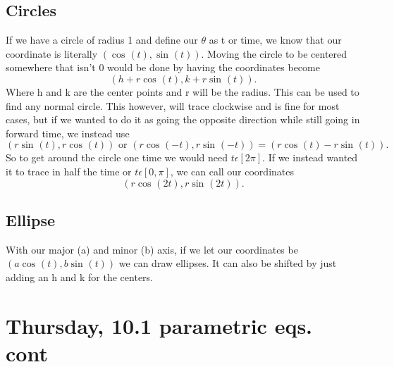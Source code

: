 \subsection{Circles}%
\label{sub:Circles}
If we have a circle of radius 1 and define our $ \theta $ as t or time, we know that our coordinate is literally $ \left( \cos^{  } \left( t \right) ,\sin^{  } \left( t \right)  \right)  $. Moving the circle to be centered somewhere that isn't 0 would be done by having the coordinates become
\[
\left( h+r\cos^{  } \left( t \right) ,k+r\sin^{  } \left( t \right)  \right)
.\] 
Where h and k are the center points and r will be the radius. This can be used to find any normal circle. This however, will trace clockwise and is fine for most cases, but if we wanted to do it as going the opposite direction while still going in forward time, we instead use 
\[
	\left( r\sin^{  } \left( t \right) , r\cos^{  } \left( t \right)  \right) \text{ or }\left( r\cos^{  } \left( -t \right) ,r\sin^{  } \left( -t \right)  \right) = \left( r\cos^{  } \left( t \right) -r\sin^{  } \left( t \right)  \right) 
.\] 
So to get around the circle one time we would need $ t\epsilon\left[ 2\pi \right]  $. If we instead wanted it to trace in half the time or $ t\epsilon\left[ 0,\pi  \right]  $, we can call our coordinates
\[
	\left( r\cos^{  } \left( 2t \right) ,r\sin^{  } \left( 2t \right)  \right) 
.\] 
\subsection{Ellipse}%
\label{sub:Ellipse}
With our major (a) and minor (b) axis, if we let our coordinates be $ \left( a\cos^{  } \left( t \right) , b\sin^{  } \left( t \right)  \right)  $ we can draw ellipses. It can also be shifted by just adding an h and k for the centers. 
\newpage
\section{Thursday, 10.1 parametric eqs. cont}%
\label{sec:Thursday, 10.1 parametric eqs. cont}

